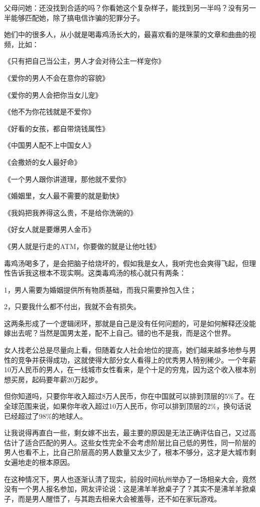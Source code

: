 \documentclass[UTF8, 11pt, oneside]{ctexart}
\begin{document}
父母问她：还没找到合适的吗？你看她这个复杂样子，能找到另一半吗？没有另一半能够匹配她，除了搞电信诈骗的犯罪分子。

她们中的很多人，从小就是喝毒鸡汤长大的，最喜欢看的是咪蒙的文章和曲曲的视频，比如：

《只有把自己当公主，男人才会对待公主一样宠你》

《爱你的男人不会在意你的容貌》

《爱你的男人会把你当女儿宠》

《他不为你花钱就是不爱你》

《好看的女孩，都自带烧钱属性》

《中国男人配不上中国女人》

《会撒娇的女人最好命》

《一个男人跟你讲道理，那他就不爱你》

《婚姻里，女人最不需要的就是勤快》

《我妈把我养得这么贵，不是给你洗碗的》

《好女人就是要爆男人金币》

《男人就是行走的ATM，你要做的就是让他吐钱》

毒鸡汤喝多了，是会把脑子给烧坏的，假如我是女人，我听完也会爽得飞起，但理性告诉我这根本不现实啊。这类毒鸡汤的核心就只有两条：

1，男人需要为婚姻提供所有物质基础，而我只需要拎包入住；

2，只要我什么都不付出，我就不会有损失。

这两条形成了一个逻辑闭环，那就是自己是没有任何问题的，可是如何解释还没能嫁出去呢？当然是国男太差，配不上自己。错的也不是我，而是这个世界。

女人找老公总是尽量向上看，但随着女人社会地位的提高，她们越来越多地参与男性的竞争并获得成功，这就使得大部分女人看得上的优秀男人特别稀少。一个年薪10万人民币的男人，在一线城市女性看来，是个十足的穷鬼，因为这个收入根本别想买房，起码要年薪20万起步。

但你知道吗，只要你年收入超过8万人民币，你在中国就可以排到顶层的5\%了。在全球范围来说，如果你年收入超过10万人民币，你可以排到顶层的2\%，换句话说已经超过了98\%的地球人。

让我说得再直白一些，剩女嫁不出去，最主要的原因是无法正确评估自己，又过高估计了适合匹配的男人。这些女性完全不会考虑阶层比自己低的男性，同一阶层的男人也看不上，比自己阶层高的男人数量又太少了，根本不够分，这才是大城市剩女遍地走的根本原因。

在这种情况下，男人也逐渐认清了现实，前段时间杭州举办了一场相亲大会，竟然没有一个男人报名参加，网友评论说：这是沸羊羊掀桌子了？其实不是沸羊羊掀桌子，而是男人醒悟了，与其跑去相亲大会被羞辱，还不如在家玩游戏。
\end{document}
